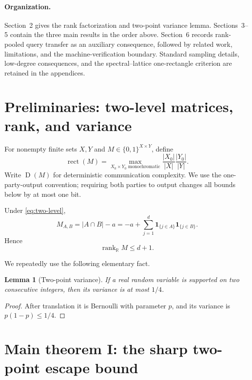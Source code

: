 \documentclass[11pt]{article}
\newtheorem{lemma}[theorem]{Lemma}
\theoremstyle{definition}
\theoremstyle{remark}
\newcommand{\R}{\mathbb R}
\newcommand{\1}{\mathbf 1}
\newcommand{\rank}{\operatorname{rank}}
\newcommand{\rect}{\operatorname{rect}}
\newcommand{\Dcc}{\operatorname{D}}
\begin{document}
\paragraph{Organization.}
Section~2 gives the rank factorization and two-point variance lemma.
Sections~3--5 contain the three main results in the order above.
Section~6 records rank-pooled query transfer as an auxiliary consequence,
followed by related work, limitations, and the machine-verification boundary.
Standard sampling details, low-degree consequences, and the
spectral--lattice one-rectangle criterion are retained in the appendices.

\section{Preliminaries: two-level matrices, rank, and variance}

For nonempty finite sets $X,Y$ and $M\in\{0,1\}^{X\times Y}$, define
\[
 \rect(M)=\max_{X_0\times Y_0\text{ monochromatic}}
 \frac{|X_0|}{|X|}\frac{|Y_0|}{|Y|}.
\]
Write $\Dcc(M)$ for deterministic communication complexity.  We use the
one-party-output convention; requiring both parties to output changes all
bounds below by at most one bit.

Under \eqref{eq:two-level},
\begin{equation}\label{eq:rank-factorization}
 M_{A,B}=|A\cap B|-a
 =-a+\sum_{j=1}^d\1_{\{j\in A\}}\1_{\{j\in B\}}.
\end{equation}
Hence
\begin{equation}\label{eq:rank-bound}
 \rank_{\R}M\le d+1.
\end{equation}

We repeatedly use the following elementary fact.

\begin{lemma}[Two-point variance]\label{lem:two-point-var}
If a real random variable is supported on two consecutive integers, then its
variance is at most $1/4$.
\end{lemma}

\begin{proof}
After translation it is Bernoulli with parameter $p$, and its variance is
$p(1-p)\le1/4$.
\end{proof}

\section{Main theorem I: the sharp two-point escape bound}
\end{document}
